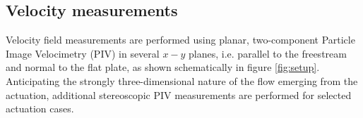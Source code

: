 \subsection{Velocity measurements \label{ss:PIV}}
Velocity field measurements are performed using planar, two-component Particle Image Velocimetry (PIV) in several $x-y$ planes, i.e. parallel to the freestream and normal to the flat plate, as shown schematically in figure \ref{fig:setup}. Anticipating the strongly three-dimensional nature of the flow emerging from the actuation, additional stereoscopic PIV measurements are performed for selected actuation cases.

